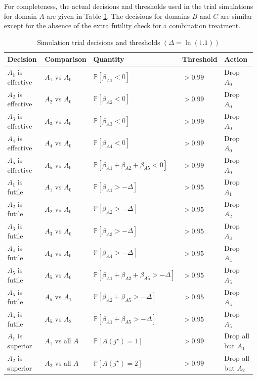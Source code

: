 \documentclass[
]{article}
\begin{document}
For completeness, the actual decisions and thresholds used in the trial simulations for domain \(A\) are given in Table \ref{tab:simdectab}.
The decisions for domains \(B\) and \(C\) are similar except for the absence of the extra futility check for a combination treatment.

\begin{table}[H]

\caption{\label{tab:simdectab}Simulation trial decisions and thresholds $(\Delta = \ln(1.1))$}
\centering
\begin{tabular}[t]{lllll}
\toprule
Decision & Comparison & Quantity & Threshold & Action\\
\midrule
$A_1$ is effective & $A_1$ vs $A_0$ & $\mathbb P[\beta_{A1}<0]$ & $>0.99$ & Drop $A_0$\\
$A_2$ is effective & $A_2$ vs $A_0$ & $\mathbb P[\beta_{A2}<0]$ & $>0.99$ & Drop $A_0$\\
$A_3$ is effective & $A_3$ vs $A_0$ & $\mathbb P[\beta_{A3}<0]$ & $>0.99$ & Drop $A_0$\\
$A_4$ is effective & $A_4$ vs $A_0$ & $\mathbb P[\beta_{A4}<0]$ & $>0.99$ & Drop $A_0$\\
$A_5$ is effective & $A_5$ vs $A_0$ & $\mathbb P[\beta_{A1}+\beta_{A2}+\beta_{A5}<0]$ & $>0.99$ & Drop $A_0$\\
$A_1$ is futile & $A_1$ vs $A_0$ & $\mathbb P[\beta_{A1}>-\Delta]$ & $>0.95$ & Drop $A_1$\\
$A_2$ is futile & $A_2$ vs $A_0$ & $\mathbb P[\beta_{A2}>-\Delta]$ & $>0.95$ & Drop $A_2$\\
$A_3$ is futile & $A_3$ vs $A_0$ & $\mathbb P[\beta_{A3}>-\Delta]$ & $>0.95$ & Drop $A_3$\\
$A_4$ is futile & $A_4$ vs $A_0$ & $\mathbb P[\beta_{A4}>-\Delta]$ & $>0.95$ & Drop $A_4$\\
$A_5$ is futile & $A_5$ vs $A_0$ & $\mathbb P[\beta_{A1}+\beta_{A2}+\beta_{A5}>-\Delta]$ & $>0.95$ & Drop $A_5$\\
$A_5$ is futile & $A_5$ vs $A_1$ & $\mathbb P[\beta_{A2}+\beta_{A5}>-\Delta]$ & $>0.95$ & Drop $A_5$\\
$A_5$ is futile & $A_5$ vs $A_2$ & $\mathbb P[\beta_{A1}+\beta_{A5}>-\Delta]$ & $>0.95$ & Drop $A_5$\\
$A_1$ is superior & $A_1$ vs all $A$ & $\mathbb P[A(j^\star)=1]$ & $>0.99$ & Drop all but $A_1$\\
$A_2$ is superior & $A_2$ vs all $A$ & $\mathbb P[A(j^\star)=2]$ & $>0.99$ & Drop all but $A_2$\\

\end{tabular}
\end{table}
\end{document}
